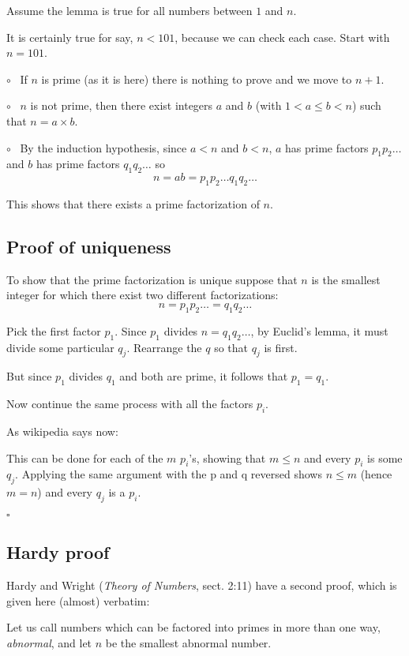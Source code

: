 \documentclass[11pt, oneside]{article}
\begin{document}
Assume the lemma is true for all numbers between $1$ and $n$.  

It is certainly true for say, $n < 101$, because we can check each case.  Start with $n = 101$.

$\circ$ \ If $n$ is prime (as it is here) there is nothing to prove and we move to $n + 1$.  

$\circ$ \  $n$ is not prime, then there exist integers $a$ and $b$ (with $1 < a \le b < n$) such that $n = a \times b$.

$\circ$ \ By the induction hypothesis, since $a < n$ and $b < n$, $a$ has prime factors $p_1 p_2 \dots$ and $b$ has prime factors $q_1 q_2 \dots$ so
\[ n = ab = p_1 p_2 \dots q_1 q_2 \dots \]

This shows that there exists a prime factorization of $n$.

\subsection*{Proof of uniqueness}

To show that the prime factorization is unique suppose that $n$ is the smallest integer for which there exist two different factorizations:
\[ n = p_1 p_2 \dots = q_1 q_2 \dots \]
    
Pick the first factor $p_1$.  Since $p_1$ divides $n = q_1 q_2 \dots$, by Euclid's lemma, it must divide some particular $q_j$.  Rearrange the $q$ so that $q_j$ is first.

But since $p_1$ divides $q_1$ and both are prime, it follows that $p_1 = q_1$. 

Now continue the same process with all the factors $p_i$.

As wikipedia says now:

    This can be done for each of the $m$ $p_i$'s, showing that $m \le n$ and every $p_i$ is some $q_j$. Applying the same argument with the p and q reversed shows $n \le m$ (hence $m = n$) and every $q_j$ is a $p_i$.
    
$\square$
    
\subsection*{Hardy proof}

Hardy and Wright (\emph{Theory of Numbers}, sect. 2:11) have a second proof, which is given here (almost) verbatim:

    Let us call numbers which can be factored into primes in more than one way, \emph{abnormal}, and let $n$ be the smallest abnormal number.
\end{document}
